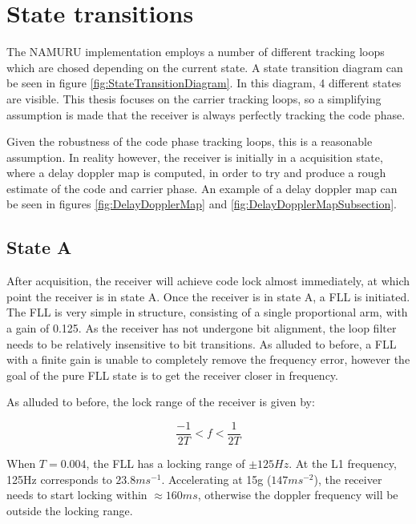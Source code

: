\label{ch:StateTransitions}
\chapter{State transitions}




The \ac{NAMURU} implementation employs a number of different tracking loops which are chosed depending on the current state. A state transition diagram can be seen in figure \ref{fig:StateTransitionDiagram}. In this diagram, 4 different states are visible. This thesis focuses on the carrier tracking loops, so a simplifying assumption is made that the receiver is always perfectly tracking the code phase. 

Given the robustness of the code phase tracking loops, this is a reasonable assumption. In reality however, the receiver is initially in a acquisition state, where a delay doppler map is computed, in order to try and produce a rough estimate of the code and carrier phase.  An example of a delay doppler map can be seen in figures \ref{fig:DelayDopplerMap} and \ref{fig:DelayDopplerMapSubsection}.


\section{State A}
After acquisition, the receiver will achieve code lock almost immediately, at which point the receiver is in state A. Once the receiver is in state A, a FLL is initiated. The FLL is very simple in structure, consisting of a single proportional arm, with a gain of 0.125. As the receiver has not undergone bit alignment, the loop filter needs to be relatively insensitive to bit transitions. As alluded to before, a FLL with a finite gain is unable to completely remove the frequency error, however the goal of the pure FLL state is to get the receiver closer in frequency.

As alluded to before, the lock range of the receiver is given by:

\begin{equation}
\frac{-1}{2T} < f < \frac{1}{2T}
\end{equation}

When $T = 0.004$, the FLL has a locking range of $\pm 125Hz$. At the L1 frequency, 125Hz corresponds to $23.8ms^{-1}$. Accelerating at 15g ($147ms^{-2}$), the receiver needs to start locking within $\approx 160ms$, otherwise the doppler frequency will be outside the locking range.

